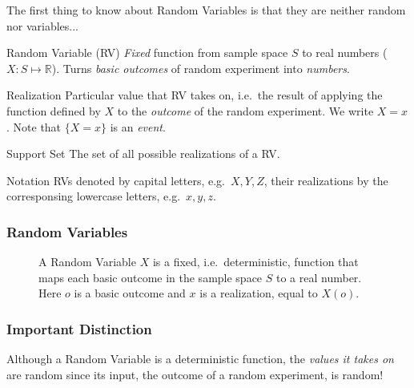\documentclass[handout]{beamer}
\begin{document}
\begin{frame}

\Large The first thing to know about Random Variables is that they are neither random nor variables...

\end{frame}
\begin{frame}
\begin{block}{Random Variable (RV)}
\emph{Fixed} function from sample space $S$ to real numbers ($X\colon S \mapsto \mathbb{R}$). Turns \emph{basic outcomes} of random experiment into \emph{numbers}.
\end{block}
 
\begin{block}{Realization}
Particular value that RV takes on, i.e.\ the result of applying the function defined by $X$ to the \emph{outcome} of the random experiment. We write $X= x$. Note that $\{X = x\}$ is an \emph{event}.
\end{block}
 
\begin{block}{Support Set}
The set of all possible realizations of a RV.
\end{block}
 
\begin{block}{Notation}
RVs denoted by capital letters, e.g.\ $X,Y,Z$, their realizations by the corresponsing lowercase letters, e.g.\ $x,y,z$.
\end{block}


\end{frame}
\def\RVraw{(-2.5,0) circle [radius=1.7]
	(-2.5,0) circle [radius=1.7]
	(2.5,0) circle [radius=1.7]
	node [above left] at (-3.75,1.25) {$S$}
	node [above right] at (3.75,1.25) {$\mathbb{R}$}
	node [above] at (0,2) {$X\colon S \mapsto \mathbb{R}$}}
\begin{frame}
\frametitle{Random Variables}

\begin{figure}
\centering
{}
\caption{A Random Variable $X$ is a fixed, i.e.\ deterministic, function that maps each basic outcome in the sample space $S$ to a real number. Here $o$ is a basic outcome and $x$ is a realization, equal to $X(o)$.}
\end{figure}


\end{frame}
\begin{frame}
\frametitle{Important Distinction}


Although a Random Variable is a deterministic function, the \alert{\emph{values it takes on}} are random since its input, the outcome of a random experiment, is random!


\end{frame}
\end{document}
